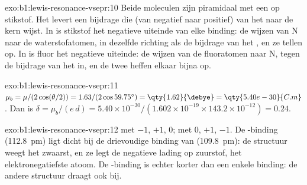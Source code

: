 \begin{solution}{exo:b1:lewis-resonance-vsepr:10}
Beide moleculen zijn piramidaal met een  op stikstof. Het  levert een bijdrage die (van negatief naar positief) van het  naar de kern wijst. In  is stikstof het negatieve uiteinde
van elke binding: de  wijzen van N naar de
waterstofatomen, in dezelfde richting als de bijdrage van het , en ze tellen op. In  is fluor het negatieve uiteinde: de
 wijzen van de fluoratomen naar N, tegen de bijdrage van
het  in, en de twee heffen elkaar bijna op.
\end{solution}

\begin{solution}{exo:b1:lewis-resonance-vsepr:11}
$\mu_b = \mu/(2\cos(\theta/2)) = 1.63/(2\cos 59.75^\circ) =
\qty{1.62}{\debye} = \qty{5.40e-30}{C.m}$. Dan is $\delta = \mu_b/(e\,d) =
5.40 \times 10^{-30}/(1.602 \times 10^{-19} \times 143.2 \times 10^{-12})
= 0.24$.
\end{solution}

\begin{solution}{exo:b1:lewis-resonance-vsepr:12}
 met  $-1$, $+1$, $0$;  met $0$,
$+1$, $-1$. De -binding (\qty{112.8}{pm}) ligt dicht bij de
drievoudige binding van  (\qty{109.8}{pm}): de structuur
 weegt het zwaarst, en ze legt de negatieve lading op zuurstof,
het elektronegatiefste atoom. De -binding is echter korter dan
een enkele binding: de andere structuur draagt ook bij.
\end{solution}

